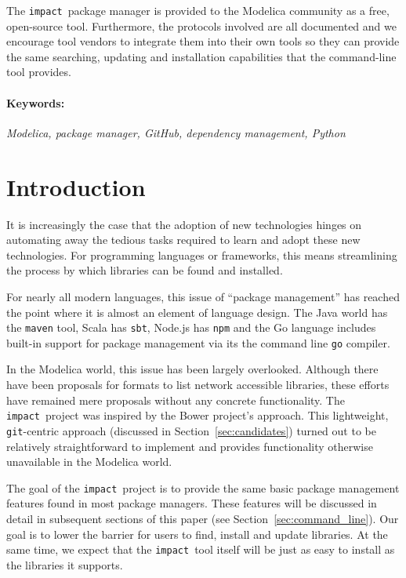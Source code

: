 \documentclass[11pt,a4paper,twocolumn]{article}
\newcommand{\impact}{\texttt{impact}} %
\newcommand{\code}[1]{\texttt{#1}} %
\begin{document}
The \impact\ package manager is provided to the Modelica community as
a free, open-source tool.  Furthermore, the protocols involved are all
documented and we encourage tool vendors to integrate them into their
own tools so they can provide the same searching, updating and
installation capabilities that the command-line tool provides.

\paragraph{Keywords:}
\emph{Modelica, package manager, GitHub, dependency management, Python}

\section{Introduction}
\label{sec:intro}

It is increasingly the case that the adoption of new technologies
hinges on automating away the tedious tasks required to learn and
adopt these new technologies.  For programming languages or
frameworks, this means streamlining the process by which libraries can
be found and installed.

For nearly all modern languages, this issue of ``package management''
has reached the point where it is almost an element of language
design.  The Java world has the \code{maven} tool, Scala has
\code{sbt}, Node.js has \code{npm} and the Go language includes
built-in support for package management via its the command line
\code{go} compiler.

In the Modelica world, this issue has been largely overlooked.
Although there have been proposals for formats to list network
accessible libraries, these efforts have remained mere proposals
without any concrete functionality.  The \impact\ project was inspired
by the Bower\cite{Bower} project's approach.  This lightweight,
\code{git}-centric approach (discussed in
Section~\ref{sec:candidates}) turned out to be relatively
straightforward to implement and provides functionality otherwise
unavailable in the Modelica world.

The goal of the \impact\ project is to provide the same basic package
management features found in most package managers.  These features
will be discussed in detail in subsequent sections of this paper (see
Section~\ref{sec:command_line}).  Our goal is to lower the barrier for
users to find, install and update libraries.  At the same time, we
expect that the \impact\ tool itself will be just as easy to install
as the libraries it supports.
\end{document}
